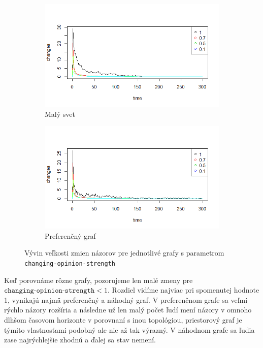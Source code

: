 \documentclass[10pt,a4paper]{report}
\begin{document}
\begin{figure}
    \begin{subfigure}[b]{0.475\textwidth}  
      \centering 
      \includegraphics[width=\textwidth]{plots/spatial-g/ChangesOneSpatial.png}
      \caption[]%
      {{\small Malý svet}}    
      \label{fig:mean and std of net24}
  \end{subfigure}
  \quad
  \begin{subfigure}[b]{0.475\textwidth}   
      \centering 
      \includegraphics[width=\textwidth]{plots/prefferential-g/changesPrefferential.png}
      \caption[]%
      {{\small Preferenčný graf}}    
      \label{fig:mean and std of net44}
  \end{subfigure}
  \caption[ Vývin zmien pre jednotlivé grafy so zmenou parametru ]
  {\small Vývin veľkosti zmien názorov pre jednotlivé grafy s parametrom \texttt{changing-opinion-strength}}
  \label{fig:mean and std of nets}
\end{figure}
Keď porovnáme rôzne grafy, pozorujeme len malé zmeny pre $\texttt{changing-opinion-strength} < 1$. Rozdiel vidíme najviac pri spomenutej hodnote 1, vynikajú najmä preferenčný a náhodný graf. V preferenčnom grafe sa veľmi rýchlo názory rozšíria a následne už len malý počet ľudí mení názory v omnoho dlhšom časovom horizonte v porovnaní s inou topológiou, priestorový graf je týmito vlastnosťami podobný ale nie až tak výrazný. V náhodnom grafe sa ľudia zase najrýchlejšie zhodnú a ďalej sa stav nemení.
\end{document}
